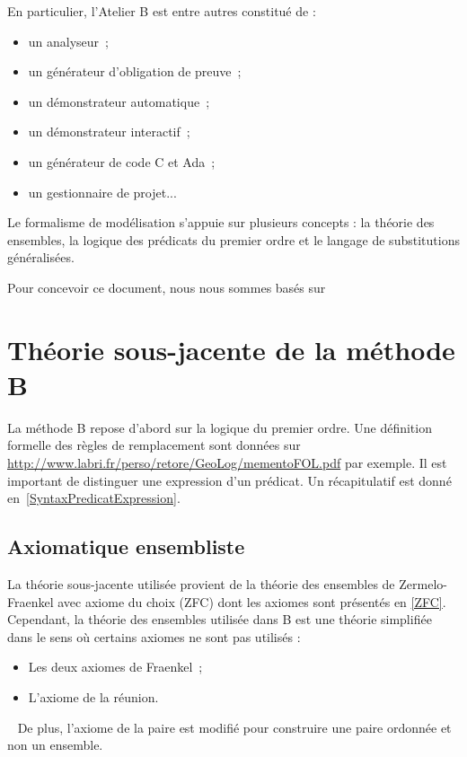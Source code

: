 \documentclass[10pt,a4paper]{article}
\begin{document}
En particulier, l'Atelier B est entre autres constitué de :
\begin{itemize}
\item un analyseur~;
\item un générateur d'obligation de preuve~;
\item un démonstrateur automatique~;
\item un démonstrateur interactif~;
\item un générateur de code C et Ada~;
\item un gestionnaire de projet...
\end{itemize}

Le formalisme de modélisation s'appuie sur plusieurs concepts : la théorie des ensembles, la logique des prédicats du premier ordre et le langage de substitutions généralisées.

Pour concevoir ce document, nous nous sommes basés sur \cite{behm1999meteor, habrias2006specifications, theBBook, dossierTechnique, VerimagPDF, introB, hevB}

\section{Théorie sous-jacente de la méthode B}

La méthode B repose d'abord sur la logique du premier ordre. Une définition formelle des règles de remplacement sont données sur \url{http://www.labri.fr/perso/retore/GeoLog/mementoFOL.pdf} par exemple. Il est important de distinguer une expression d'un prédicat. Un récapitulatif est donné en~\cref{SyntaxPredicatExpression}.

\subsection{Axiomatique ensembliste}

La théorie sous-jacente utilisée provient de la théorie des ensembles de Zermelo-Fraenkel avec axiome du choix (ZFC) dont les axiomes sont présentés en \cref{ZFC}.
Cependant, la théorie des ensembles utilisée dans B est une théorie simplifiée dans le sens où certains axiomes ne sont pas utilisés :
\begin{itemize}
\item Les deux axiomes de  Fraenkel~;
\item L'axiome de la réunion.
\end{itemize}~
De plus, l'axiome de la paire est modifié pour construire une paire ordonnée et non un ensemble. 
\end{document}
